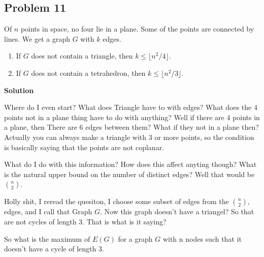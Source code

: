 \documentclass{article}
\begin{document}
\begin{tikzpicture}

\end{tikzpicture}

\subsection{Problem 11}
Of $n$ points in space, no four lie in a plane. Some of the points are connected by
lines. We get a graph $G$ with $k$ edges.
\begin{enumerate}
    \item[(a)] If $G$ does not contain a triangle, then $k \leq \lfloor n^2/4 \rfloor$.
    \item[(b)] If $G$ does not contain a tetrahedron, then $k \leq \lfloor n^2/3 \rfloor$.
\end{enumerate}


\textbf{Solution}

Where do I even start? What does Triangle have to with edges? What does the 4 points not in a plane thing have to do with anything?
Well if there are 4 points in a plane, then There are 6 edges between them? What if they not in a plane then?
Actually you can always make a triangle with 3 or more points, so the condition is basically saying that the points are not coplanar.

What do I do with this information? How does this affect anyting though? What is the natural upper bound on the number of distinct edges?
Well that would be $\binom{n}{2}$. 

Holly shit, I reread the quesiton, I choose some subset of edges from the $\binom{n}{2}$, edges, and I call that Graph $G$. 
Now this graph doesn't have a triangel? So that are not cycles of length 3. That is what is it saying?

So what is the maximum of $E(G)$ for a graph $G$ with n nodes such that it doesn't have a cycle of length 3. 
\end{document}
